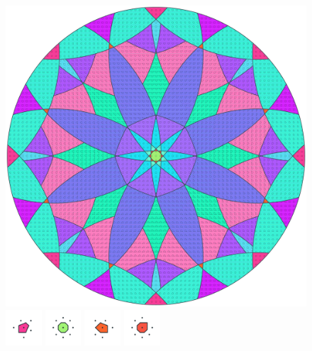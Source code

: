 \documentclass[text.tex]{subfiles}
\begin{document}
\clearpage
\pagestyle{fancy}
\fancyhf{}
\begin{figure}[h!]
\centering
\includegraphics[width=1\textwidth]{img/results/circle8/circle8_103553_(-10_5alpha_2).pdf}
\includegraphics[width=0.12\textwidth]{img/results/circle8/circle8_103553_(-10_5alpha_2)_001.pdf}
\includegraphics[width=0.12\textwidth]{img/results/circle8/circle8_103553_(-10_5alpha_2)_002.pdf}
\includegraphics[width=0.12\textwidth]{img/results/circle8/circle8_103553_(-10_5alpha_2)_003.pdf}
\includegraphics[width=0.12\textwidth]{img/results/circle8/circle8_103553_(-10_5alpha_2)_004.pdf}

\end{figure}
\end{document}
